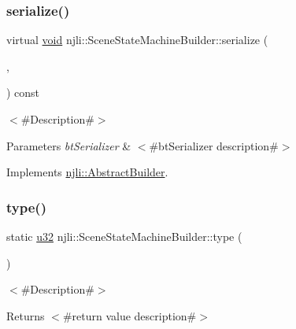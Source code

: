 \subsubsection{\texorpdfstring{serialize()}{serialize()}}
{\footnotesize\ttfamily virtual \mbox{\hyperlink{_thread_8h_af1e856da2e658414cb2456cb6f7ebc66}{void}} njli\+::\+Scene\+State\+Machine\+Builder\+::serialize (\begin{DoxyParamCaption}\item[{\mbox{\hyperlink{_thread_8h_af1e856da2e658414cb2456cb6f7ebc66}{void}} $\ast$}]{,  }\item[{bt\+Serializer $\ast$}]{ }\end{DoxyParamCaption}) const\hspace{0.3cm}{\ttfamily [virtual]}}

$<$\#\+Description\#$>$


\begin{DoxyParams}{Parameters}
{\em bt\+Serializer} & $<$\#bt\+Serializer description\#$>$ \\
\hline
\end{DoxyParams}


Implements \mbox{\hyperlink{classnjli_1_1_abstract_builder_ab66b774e02ccb9da554c9aab7fa6d981}{njli\+::\+Abstract\+Builder}}.

\mbox{\label{classnjli_1_1_scene_state_machine_builder_abdae2a2e543b6c7d76de85efb832510f}} 
\subsubsection{\texorpdfstring{type()}{type()}}
{\footnotesize\ttfamily static \mbox{\hyperlink{_util_8h_a10e94b422ef0c20dcdec20d31a1f5049}{u32}} njli\+::\+Scene\+State\+Machine\+Builder\+::type (\begin{DoxyParamCaption}{ }\end{DoxyParamCaption})\hspace{0.3cm}{\ttfamily [static]}}

$<$\#\+Description\#$>$

\begin{DoxyReturn}{Returns}
$<$\#return value description\#$>$ 
\end{DoxyReturn}


